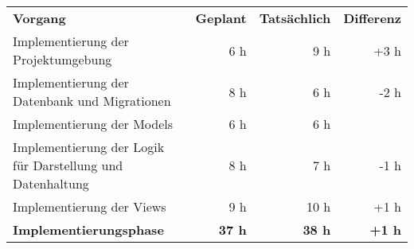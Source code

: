 \begin{tabular}{lrrr}
\rowcolor{heading}\textbf{Vorgang} & \textbf{Geplant} & \textbf{Tatsächlich} & \textbf{Differenz} \\
Implementierung der Projektumgebung & 6 h & 9 h & +3 h \\
\rowcolor{odd}Implementierung der Datenbank und Migrationen & 8 h & 6 h & -2 h \\
Implementierung der Models & 6 h & 6 h &  \\
\rowcolor{odd}Implementierung der Logik für Darstellung und Datenhaltung & 8 h & 7 h & -1 h \\
Implementierung der Views & 9 h & 10 h & +1 h \\
\hline
\hline
\rowcolor{heading}\textbf{Implementierungsphase} & \textbf{37 h} & \textbf{38 h} & \textbf{+1 h} \\
\end{tabular}
